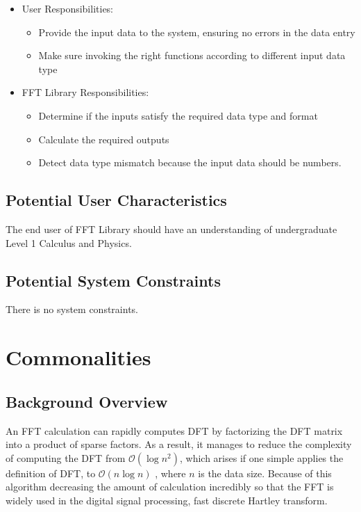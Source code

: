 \documentclass[12pt]{article}
\newcommand{\famname}{FFT}
\begin{document}
\begin{itemize} \item User Responsibilities: \begin{itemize} \item Provide the
input data to the system, ensuring no errors in the data entry \item Make sure
invoking the right functions according to different input data type
\end{itemize} \item \famname{} Library Responsibilities: \begin{itemize} \item Determine
if the inputs satisfy the required data type and format \item Calculate the
required outputs \item Detect data type mismatch because the input data should
be numbers. \end{itemize} \end{itemize}

\subsection{Potential User Characteristics} \label{SecUserCharacteristics}

The end user of \famname{} Library should have an understanding of undergraduate
Level 1 Calculus and Physics.

\subsection{Potential System Constraints} There is no system constraints.
\section{Commonalities}

\subsection{Background Overview} \label{Sec_Background} An FFT calculation can
rapidly computes DFT by factorizing the DFT matrix into a product of sparse
factors. As a result, it manages to reduce the complexity of computing the DFT
from $\mathcal{O}(\log{}n^2)$, which arises
if one simple applies the definition of DFT, to $\mathcal{O}(n\log{}n)$ , where
$\mathcal{}n$ is the data size. Because of this algorithm decreasing the amount
of calculation incredibly so that the FFT is widely used in the digital signal
processing, fast discrete Hartley transform.
\end{document}
